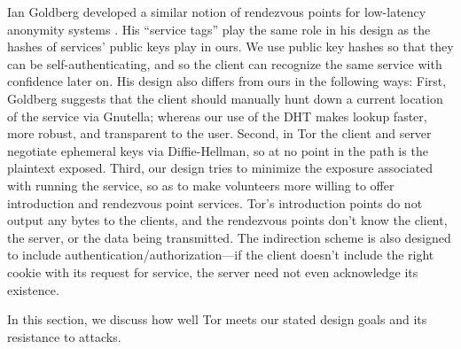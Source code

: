 \documentclass[times,10pt,twocolumn]{article}
\begin{document}
Ian Goldberg developed a similar notion of rendezvous points for
low-latency anonymity systems \cite{ian-thesis}. His ``service tags''
play the same role in his design as the hashes of services' public
keys play in ours.  We use public key hashes so that they can be
self-authenticating, and so the client can recognize the same service
with confidence later on. His design also differs from ours in the
following ways: First, Goldberg suggests that the client should
manually hunt down a current location of the service via Gnutella;
whereas our use of the DHT makes lookup faster, more robust, and
transparent to the user. Second, in Tor the client and server
negotiate ephemeral keys via Diffie-Hellman, so at no point in the
path is the plaintext exposed. Third, our design tries to minimize the
exposure associated with running the service, so as to make volunteers
more willing to offer introduction and rendezvous point services.
Tor's introduction points do not output any bytes to the clients, and
the rendezvous points don't know the client, the server, or the data
being transmitted. The indirection scheme is also designed to include
authentication/authorization---if the client doesn't include the right
cookie with its request for service, the server need not even
acknowledge its existence.

\label{sec:analysis}

In this section, we discuss how well Tor meets our stated design goals
and its resistance to attacks.
\end{document}
